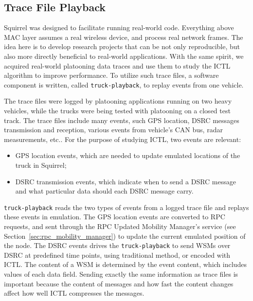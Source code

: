 \documentclass[12pt]{report}
\begin{document}
\subsection{Trace File Playback}
\label{sec:truck_playback}

Squirrel was designed to facilitate running real-world code. Everything above MAC layer assumes a real wireless device, and process real network frames. The idea here is to develop research projects that can be not only reproducible, but also more directly beneficial to real-world applications. With the same spirit, we acquired real-world platooning data traces and use them to study the ICTL algorithm to improve performance. To utilize such trace files, a software component is written, called \texttt{truck-playback}, to replay events from one vehicle.

The trace files were logged by platooning applications running on two heavy vehicles, while the trucks were being tested with platooning on a closed test track. The trace files include many events, such GPS location, DSRC messages transmission and reception, various events from vehicle's CAN bus, radar measurements, etc.. For the purpose of studying ICTL, two events are relevant:

\begin{itemize}
  \item GPS location events, which are needed to update emulated locations of the truck in Squirrel;
  \item DSRC transmission events, which indicate when to send a DSRC message and what particular data should each DSRC message carry.
\end{itemize}

\texttt{truck-playback} reads the two types of events from a logged trace file and replays these events in emulation. The GPS location events are converted to RPC requests, and sent through the RPC Updated Mobility Manager's service (see Section~\ref{sec:rpc_mobility_manager}) to update the current emulated position of the node. The DSRC events drives the \texttt{truck-playback} to send WSMs over DSRC at predefined time points, using traditional method, or encoded with ICTL. The content of a WSM is determined by the event content, which includes values of each data field. Sending exactly the same information as trace files is important because the content of messages and how fast the content changes affect how well ICTL compresses the messages.
\end{document}
